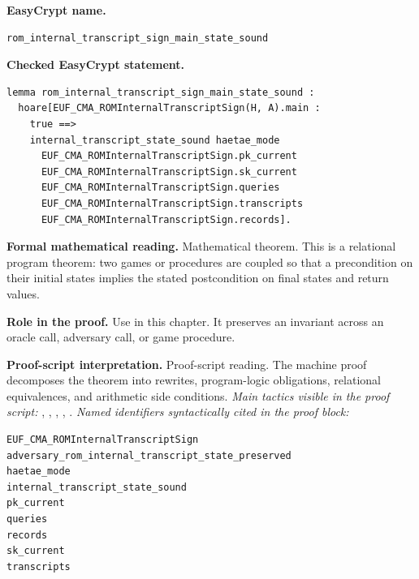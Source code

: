 \begin{formaltheorem}
\noindent\textbf{EasyCrypt name.}
\begin{lstlisting}[language=EasyCrypt,basicstyle=\ttfamily\scriptsize]
rom_internal_transcript_sign_main_state_sound
\end{lstlisting}
\noindent\textbf{Checked EasyCrypt statement.}
\begin{lstlisting}[language=EasyCrypt,basicstyle=\ttfamily\scriptsize]
lemma rom_internal_transcript_sign_main_state_sound :
  hoare[EUF_CMA_ROMInternalTranscriptSign(H, A).main :
    true ==>
    internal_transcript_state_sound haetae_mode
      EUF_CMA_ROMInternalTranscriptSign.pk_current
      EUF_CMA_ROMInternalTranscriptSign.sk_current
      EUF_CMA_ROMInternalTranscriptSign.queries
      EUF_CMA_ROMInternalTranscriptSign.transcripts
      EUF_CMA_ROMInternalTranscriptSign.records].
\end{lstlisting}
\noindent\textbf{Formal mathematical reading.}
Mathematical theorem. This is a relational program theorem: two games or procedures are coupled so that a precondition on their initial states implies the stated postcondition on final states and return values.

\noindent\textbf{Role in the proof.}
Use in this chapter. It preserves an invariant across an oracle call, adversary call, or game procedure.

\noindent\textbf{Proof-script interpretation.}
Proof-script reading. The machine proof decomposes the theorem into rewrites, program-logic obligations, relational equivalences, and arithmetic side conditions.
\emph{Main tactics visible in the proof script:} , , , , .
\emph{Named identifiers syntactically cited in the proof block:}
\begin{lstlisting}[language=EasyCrypt,basicstyle=\ttfamily\scriptsize]
EUF_CMA_ROMInternalTranscriptSign
adversary_rom_internal_transcript_state_preserved
haetae_mode
internal_transcript_state_sound
pk_current
queries
records
sk_current
transcripts
\end{lstlisting}

\end{formaltheorem}

